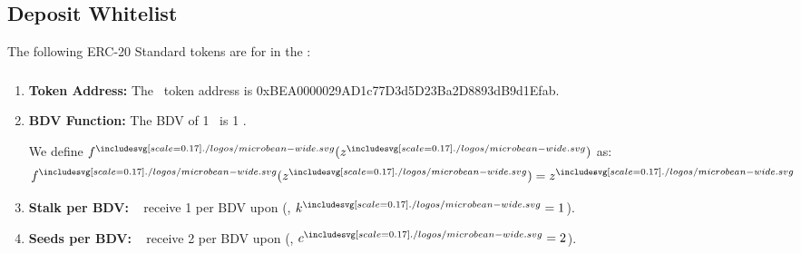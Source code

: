\documentclass[class=article, crop=false]{standalone}
\begin{document}
\subsection{Deposit Whitelist}
The following ERC-20 Standard tokens are  for  in the :
\subsubsection{\Bean}
    \begin{enumerate}
        \item \textbf{Token Address:} The \Bean\ token address is 0xBEA0000029AD1c77D3d5D23Ba2D8893dB9d1Efab.
        \item \textbf{BDV Function:} The BDV of 1 \Bean\ is 1 \Bean. 

We define $f^{\bean}(z^{\bean})$ as:
$$f^{\bean}(z^{\bean}) = z^{\bean}$$
        \item \textbf{Stalk per BDV:} \Bean\  receive 1  per BDV upon  (, $k^{\bean} = 1$).
        \item \textbf{Seeds per BDV:} \Bean\  receive 2  per BDV upon  (, $c^{\bean} = 2$).
    \end{enumerate}
\end{document}
